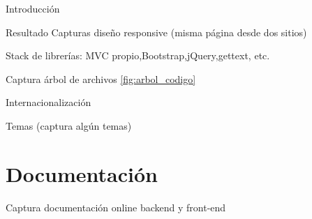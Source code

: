 Introducción

Resultado Capturas diseño responsive (misma página desde dos sitios)

Stack de librerías: MVC propio,Bootstrap,jQuery,gettext, etc.

Captura árbol de archivos \ref{fig:arbol_codigo}

Internacionalización

Temas (captura algún temas)

\section{Documentación\label{sec:imp:docs}}

Captura documentación online backend y front-end